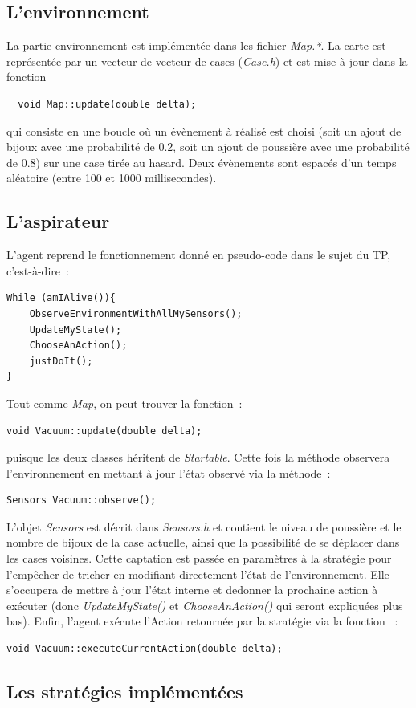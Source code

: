\documentclass{article}
\begin{document}
\subsection{L'environnement}
La partie environnement est implémentée dans les fichier \emph{Map.*}. La carte
est représentée par un vecteur de vecteur de cases (\emph{Case.h}) et est mise à
jour dans la fonction \begin{verbatim}
  void Map::update(double delta);
\end{verbatim}
qui consiste en une boucle où un évènement à réalisé est choisi (soit un ajout
de bijoux avec une probabilité de 0.2, soit un ajout de poussière avec une
probabilité de 0.8) sur une case tirée au hasard. Deux évènements sont espacés
d'un temps aléatoire (entre 100 et 1000 millisecondes).
\subsection{L'aspirateur}
L'agent reprend le fonctionnement donné en pseudo-code dans le sujet du TP,
c'est-à-dire~:
\begin{verbatim}
While (amIAlive()){
    ObserveEnvironmentWithAllMySensors();
    UpdateMyState();
    ChooseAnAction();
    justDoIt();
}
\end{verbatim}
Tout comme \emph{Map}, on peut trouver la fonction~:
\begin{verbatim}
void Vacuum::update(double delta);
\end{verbatim}
puisque les deux classes héritent de \emph{Startable}. Cette fois la méthode 
observera l'environnement en mettant à jour l'état observé via la méthode~:
\begin{verbatim}
Sensors Vacuum::observe();
\end{verbatim}
L'objet \emph{Sensors} est décrit dans \emph{Sensors.h} et contient le niveau de
poussière et le nombre de bijoux de la case actuelle, ainsi que la possibilité
de se déplacer dans les cases voisines. Cette captation est passée en paramètres
à la stratégie pour l'empêcher de tricher en modifiant directement l'état de
l'environnement. Elle s'occupera de mettre à jour l'état interne et dedonner la
prochaine action à exécuter (donc \emph{UpdateMyState()} et
\emph{ChooseAnAction()} qui seront expliquées plus bas). Enfin, l'agent exécute
l'Action retournée par la stratégie via la fonction ~:
\begin{verbatim}
void Vacuum::executeCurrentAction(double delta);
\end{verbatim}
\subsection{Les stratégies implémentées}
\end{document}
